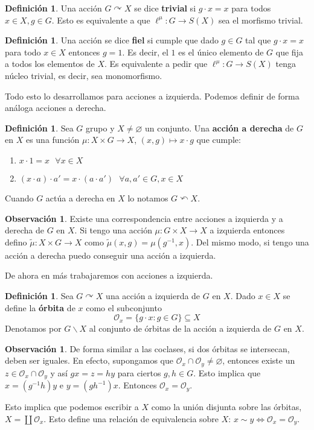 \documentclass[12pt]{book}
\theoremstyle{definition}
\newtheorem{obs}[teo]{Observación}
\newtheorem{defn}[teo]{Definición}
\let\emptyset\varnothing
\def\acts{\curvearrowright}
\def\stca{\curvearrowleft}
\begin{document}
\begin{defn}
Una acción $G\acts X$ se dice \textbf{trivial} si $g\cdot x = x$ para todos $x\in X, g\in G$. Esto es equivalente a que $\ell^\mu : G\to S(X)$ sea el morfismo trivial.
\end{defn}
\begin{defn}
Una acción se dice \textbf{fiel} si cumple que dado $g\in G$ tal que $g\cdot x = x$ para todo $x\in X$ entonces $g=1$. Es decir, el $1$ es el único elemento de $G$ que fija a todos los elementos de $X$. Es equivalente a pedir que $\ell^\mu :G\to S(X)$ tenga núcleo trivial, es decir, sea monomorfismo.
\end{defn}

Todo esto lo desarrollamos para acciones a izquierda. Podemos definir de forma análoga acciones a derecha.
\begin{defn}
Sea $G$ grupo y $X\neq \emptyset$ un conjunto. Una \textbf{acción a derecha} de $G$ en $X$ es una función $\mu:X\times G\to X$, $(x,g)\mapsto x\cdot g$ que cumple: \begin{enumerate}\item $x\cdot 1 = x \text{ }\forall x\in X$ \item $(x\cdot a)\cdot a' = x\cdot (a\cdot a') \text{ } \forall a,a'\in G, x\in X$\end{enumerate}

Cuando $G$ actúa a derecha en $X$ lo notamos $G\stca X$.
\end{defn}
\begin{obs}
Existe una correspondencia entre acciones a izquierda y a derecha de $G$ en $X$. Si tengo una acción $\mu:G\times X\to X$ a izquierda entonces defino $\tilde{\mu}:X\times G\to X$ como $\tilde{\mu}(x,g) = \mu (g^{-1},x)$. Del mismo modo, si tengo una acción a derecha puedo conseguir una acción a izquierda.
\end{obs}
De ahora en más trabajaremos con acciones a izquierda.
\begin{defn}
Sea $G\acts X$ una acción a izquierda de $G$ en $X$. Dado $x\in X$ se define la \textbf{órbita} de $x$ como el subconjunto $$\mathcal{O}_x=\{g\cdot x : g\in G\}\subseteq X$$ Denotamos por $G\backslash X$ al conjunto de órbitas de la acción a izquierda de $G$ en $X$.
\end{defn}
\begin{obs}
De forma similar a las coclases, si dos órbitas se intersecan, deben ser iguales. En efecto, supongamos que $\mathcal{O}_x\cap \mathcal{O}_y \neq \emptyset$, entonces existe un $z\in \mathcal{O}_x\cap\mathcal{O}_y$ y así $gx=z=hy$ para ciertos $g,h\in G$. Esto implica que $x=(g^{-1}h)y$ e $y=(gh^{-1})x$. Entonces $\mathcal{O}_x = \mathcal{O}_y$.

Esto implica que podemos escribir a $X$ como la unión disjunta sobre las órbitas, $X=\coprod{\mathcal{O}_x}$. Esto define una relación de equivalencia sobre $X$: $x\sim y \Longleftrightarrow \mathcal{O}_x = \mathcal{O}_y$.

\end{obs}
\end{document}
